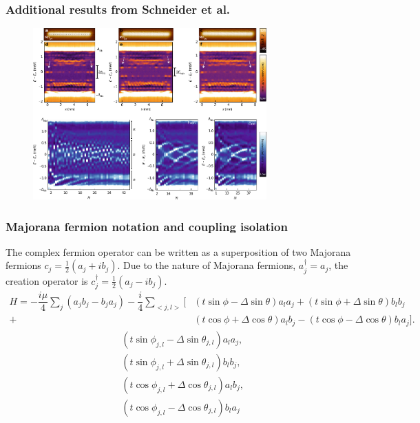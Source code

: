 \documentclass[xcolor=dvipsnames,10pt,aspectratio=169]{beamer}
\newcommand{\cc}{c^{\dagger}}
\newcommand{\de}{\Delta}
\begin{document}
  \begin{frame}
    \frametitle{Additional results from Schneider et al.}

    \begin{figure}
      \includegraphics[width=0.8\textwidth]{./figures/Schneider-additional-results.pdf}
    \end{figure}

  \end{frame}

  \begin{frame}
  \frametitle{Majorana fermion notation and coupling isolation}
    The complex fermion operator can be written as a superposition of two Majorana fermions $c_j = \frac{1}{2} (a_j + i b_j)$.
    Due to the nature of Majorana fermions, $a^{\dagger}_j = a_j$, the creation operator is $\cc_j = \frac{1}{2} (a_j - i b_j)$.
    \begin{align*}
      H = -\dfrac{i\mu}{4} \sum_j (a_j b_j - b_j a_j) - \dfrac{i}{4} \sum_{<j,l>} [&(t\sin\phi-\de\sin\theta) a_l a_j + (t\sin\phi+\de\sin\theta) b_l b_j \nonumber \\
      +&(t\cos\phi+\de\cos\theta) a_l b_j - (t\cos\phi-\de\cos\theta) b_l a_j].
    \end{align*}
    \begin{align}
      &(t \sin\phi_{j,l} - \de \sin\theta_{j,l}) a_l a_j, \\
      &(t \sin\phi_{j,l} + \de \sin\theta_{j,l}) b_l b_j, \\
      &(t \cos\phi_{j,l} + \de \cos\theta_{j,l}) a_l b_j, \\
      &(t \cos\phi_{j,l} - \de \cos\theta_{j,l}) b_l a_j
    \end{align}
  \end{frame}
\end{document}
